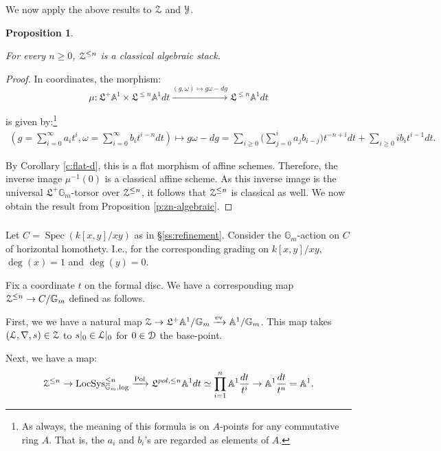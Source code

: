 \documentclass[reqno,11pt]{amsart}
\numberwithin{equation}{subsection}
\newtheorem{prop}[thm]{Proposition}
\theoremstyle{remark}
\newcommand{\xar}[1]{\xrightarrow{#1}}
\newcommand{\bA}{{\mathbb A}}
\newcommand{\bG}{{\mathbb G}}
\newcommand{\sD}{{\EuScript D}}
\newcommand{\sL}{{\EuScript L}}
\newcommand{\sY}{{\EuScript Y}}
\newcommand{\sZ}{{\EuScript Z}}
\newcommand{\fL}{{\mathfrak L}}
\newcommand{\on}{\operatorname}
\newcommand{\Spec}{\on{Spec}}
\newcommand{\ev}{\on{ev}}
\newcommand{\LocSys}{\on{LocSys}}
\newcommand{\Pol}{\on{Pol}}
\begin{document}
We now apply the above results to $\sZ$ and $\sY$.

\begin{prop}\label{p:zn-cl}

For every $n \geq 0$, $\sZ^{\leq n}$ is a
classical algebraic stack.

\end{prop}

\begin{proof}

In coordinates, the morphism:
%
\[
\mu:\fL^+ \bA^1 \times \fL^{\leq n} \bA^1 dt 
\xar{(g,\omega) \mapsto g\omega - dg}
\fL^{\leq n} \bA^1 dt
\]

\noindent is given by:\footnote{As always, the meaning of this
formula is on $A$-points for any commutative ring $A$. That is,  
the $a_i$ and $b_i$'s are regarded as elements of $A$.} 
%
\[
\begin{gathered}
(g = \sum_{i=0}^{\infty} a_i t^i, 
\omega = \sum_{i = 0}^{\infty} b_i t^{i-n} dt) \mapsto 
g \omega - dg = 
\sum_{i \geq 0} 
\big(\sum_{j = 0}^i a_j b_{i-j}\big) t^{-n+i} dt 
+ \sum_{i \geq 0} i b_i t^{i-1} dt. 
\end{gathered}
\]

By Corollary \ref{c:flat-d}, this is a flat morphism of affine schemes.
Therefore, the inverse image $\mu^{-1}(0)$ is a classical affine scheme.
As this inverse image is the universal $\fL^+ \bG_m$-torsor
over $\sZ^{\leq n}$, it follows that $\sZ^{\leq n}$ is classical as well.
We now obtain the result from Proposition \ref{p:zn-algebraic}.

\end{proof}

\subsubsection{}\label{ss:z-refinement}

Let $C = \Spec(k[x,y]/xy)$ as in \S \ref{ss:refinement}.
Consider the $\bG_m$-action on $C$ of horizontal 
homothety. I.e., for the corresponding grading on
$k[x,y]/xy$, $\deg(x) = 1$ and $\deg(y) = 0$. 

Fix a coordinate $t$ on the formal disc.
We have a corresponding 
map $\sZ^{\leq n} \to C/\bG_m$ defined as follows.

First, we we have a natural map 
$\sZ \to \fL^+\bA^1/\bG_m \xar{\ev} \bA^1/\bG_m$.
This map takes $(\sL,\nabla,s) \in \sZ$ to $s|_0 \in \sL|_0$ 
for $0 \in \sD$ the base-point.

Next, we have a map:
%
\[
\sZ^{\leq n} \to \LocSys_{\bG_m,\log}^{\leq n}
\xar{\Pol} \fL^{pol,\leq n} \bA^1 dt
\simeq \prod_{i=1}^n \bA^1 \frac{dt}{t^i} 
\to \bA^1 \frac{dt}{t^n} = \bA^1.
\]
\end{document}
